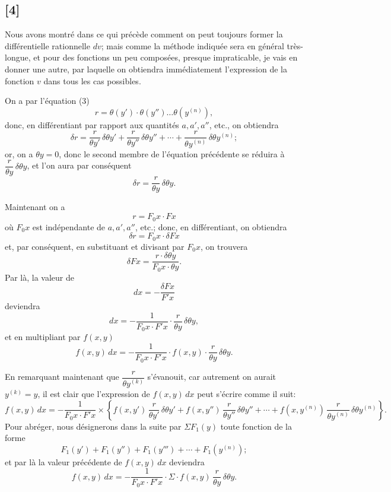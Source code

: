 \documentclass{article}
\begin{document}
\subsection*{[4]}

Nous avons montré dans ce qui précède comment on peut toujours former la différentielle rationnelle $dv$; mais comme la méthode indiquée sera en général très-longue, et pour des fonctions un peu composées, presque impraticable, je vais en donner une autre, par laquelle on obtiendra immédiatement l'expression de la fonction $v$ dans tous les cas possibles.

On a par l'équation (3)
\[ r = \theta(y') \cdot \theta(y'') \ldots \theta(y^{(n)}), \]
donc, en différentiant par rapport aux quantités $a, a', a''$, etc., on obtiendra
\[ \delta r = \frac{r}{\theta y'}\,\delta\theta y' + \frac{r}{\theta y''}\,\delta\theta y'' + \cdots + \frac{r}{\theta y^{(n)}}\,\delta\theta y^{(n)}; \]
or, on a $\theta y = 0$, donc le second membre de l'équation précédente se réduira à $\dfrac{r}{\theta y}\,\delta\theta y$, et l'on aura par conséquent
\[ \delta r = \frac{r}{\theta y}\,\delta\theta y. \]

Maintenant on a
\[ r = F_0 x \cdot F x \]
où $F_0 x$ est indépendante de $a, a', a''$, etc.; donc, en différentiant, on obtiendra
\[ \delta r = F_0 x \cdot \delta F x \]
et, par conséquent, en substituant et divisant par $F_0 x$, on trouvera
\[ \delta F x = \frac{r \cdot \delta\theta y}{F_0 x \cdot \theta y}. \]
Par là, la valeur de
\[ dx = -\frac{\delta F x}{F' x} \]
deviendra
\[ dx = -\frac{1}{F_0 x \cdot F' x} \cdot \frac{r}{\theta y}\,\delta\theta y, \]
et en multipliant par $f(x, y)$
\[ f(x, y)\,dx = -\frac{1}{F_0 x \cdot F' x} \cdot f(x, y) \cdot \frac{r}{\theta y}\,\delta\theta y. \]

En remarquant maintenant que $\dfrac{r}{\theta y^{(k)}}$ s'évanouit, car autrement on aurait $y^{(k)} = y$, il est clair que l'expression de $f(x, y)\,dx$ peut s'écrire comme il suit:
\[ f(x, y)\,dx = -\frac{1}{F_0 x \cdot F' x} \times \left\{ f(x, y')\,\frac{r}{\theta y'}\,\delta\theta y' + f(x, y'')\,\frac{r}{\theta y''}\,\delta\theta y'' + \cdots + f(x, y^{(n)})\,\frac{r}{\theta y^{(n)}}\,\delta\theta y^{(n)} \right\}. \]
Pour abréger, nous désignerons dans la suite par $\Sigma F_1(y)$ toute fonction de la forme
\[ F_1(y') + F_1(y'') + F_1(y''') + \cdots + F_1(y^{(n)}); \]
et par là la valeur précédente de $f(x, y)\,dx$ deviendra
\[ f(x, y)\,dx = -\frac{1}{F_0 x \cdot F' x} \cdot \Sigma \cdot f(x, y)\,\frac{r}{\theta y}\,\delta\theta y. \tag{15} \]
\end{document}
